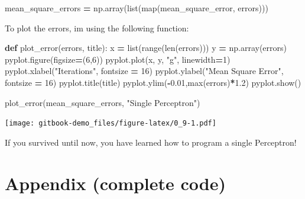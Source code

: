 \documentclass[
]{book}
\newenvironment{Shaded}{\begin{snugshade}}{\end{snugshade}}
\newcommand{\BuiltInTok}[1]{#1}
\newcommand{\DecValTok}[1]{\textcolor[rgb]{0.00,0.00,0.81}{#1}}
\newcommand{\FloatTok}[1]{\textcolor[rgb]{0.00,0.00,0.81}{#1}}
\newcommand{\KeywordTok}[1]{\textcolor[rgb]{0.13,0.29,0.53}{\textbf{#1}}}
\newcommand{\NormalTok}[1]{#1}
\newcommand{\OperatorTok}[1]{\textcolor[rgb]{0.81,0.36,0.00}{\textbf{#1}}}
\newcommand{\StringTok}[1]{\textcolor[rgb]{0.31,0.60,0.02}{#1}}
\begin{document}
\begin{Shaded}
\begin{Highlighting}[]
\NormalTok{mean\_square\_errors }\OperatorTok{=}\NormalTok{ np.array(}\BuiltInTok{list}\NormalTok{(}\BuiltInTok{map}\NormalTok{(mean\_square\_error, errors)))}
\end{Highlighting}
\end{Shaded}

To plot the errors, im using the following function:

\begin{Shaded}
\begin{Highlighting}[]
\KeywordTok{def}\NormalTok{ plot\_error(errors, title):}
\NormalTok{  x }\OperatorTok{=} \BuiltInTok{list}\NormalTok{(}\BuiltInTok{range}\NormalTok{(}\BuiltInTok{len}\NormalTok{(errors)))}
\NormalTok{  y }\OperatorTok{=}\NormalTok{ np.array(errors)}
\NormalTok{  pyplot.figure(figsize}\OperatorTok{=}\NormalTok{(}\DecValTok{6}\NormalTok{,}\DecValTok{6}\NormalTok{))}
\NormalTok{  pyplot.plot(x, y, }\StringTok{"g"}\NormalTok{, linewidth}\OperatorTok{=}\DecValTok{1}\NormalTok{)}
\NormalTok{  pyplot.xlabel(}\StringTok{"Iterations"}\NormalTok{, fontsize }\OperatorTok{=} \DecValTok{16}\NormalTok{)}
\NormalTok{  pyplot.ylabel(}\StringTok{"Mean Square Error"}\NormalTok{, fontsize }\OperatorTok{=} \DecValTok{16}\NormalTok{)}
\NormalTok{  pyplot.title(title)}
\NormalTok{  pyplot.ylim(}\OperatorTok{{-}}\FloatTok{0.01}\NormalTok{,}\BuiltInTok{max}\NormalTok{(errors)}\OperatorTok{*}\FloatTok{1.2}\NormalTok{)}
\NormalTok{  pyplot.show()}
  
  
\NormalTok{plot\_error(mean\_square\_errors, }\StringTok{"Single Perceptron"}\NormalTok{)}
\end{Highlighting}
\end{Shaded}

\texttt{[image: gitbook-demo\_files/figure-latex/0\_9-1.pdf]}

If you survived until now, you have learned how to program a single Perceptron!

\hypertarget{appendix-complete-code}{%
\section{Appendix (complete code)}\label{appendix-complete-code}}
\end{document}
